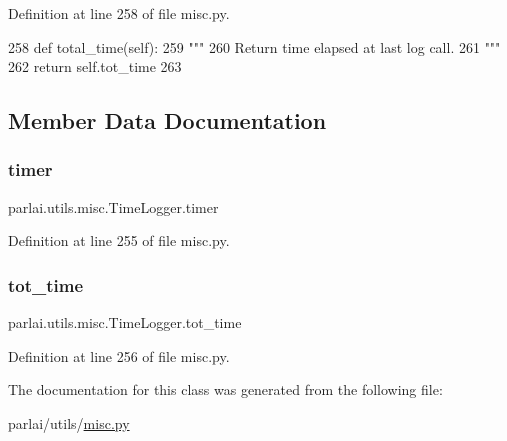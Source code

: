 Definition at line 258 of file misc.\+py.


\begin{DoxyCode}
258     \textcolor{keyword}{def }total\_time(self):
259         \textcolor{stringliteral}{"""}
260 \textcolor{stringliteral}{        Return time elapsed at last log call.}
261 \textcolor{stringliteral}{        """}
262         \textcolor{keywordflow}{return} self.tot\_time
263 
\end{DoxyCode}


\subsection{Member Data Documentation}
\mbox{\label{classparlai_1_1utils_1_1misc_1_1TimeLogger_a7592e5ebb754f91e73b66b409fda2d77}} 
\subsubsection{\texorpdfstring{timer}{timer}}
{\footnotesize\ttfamily parlai.\+utils.\+misc.\+Time\+Logger.\+timer}



Definition at line 255 of file misc.\+py.

\mbox{\label{classparlai_1_1utils_1_1misc_1_1TimeLogger_a831849f16f6779f8b77289c3caa65689}} 
\subsubsection{\texorpdfstring{tot\+\_\+time}{tot\_time}}
{\footnotesize\ttfamily parlai.\+utils.\+misc.\+Time\+Logger.\+tot\+\_\+time}



Definition at line 256 of file misc.\+py.



The documentation for this class was generated from the following file\+:\begin{DoxyCompactItemize}
\item 
parlai/utils/\hyperlink{misc_8py}{misc.\+py}\end{DoxyCompactItemize}
